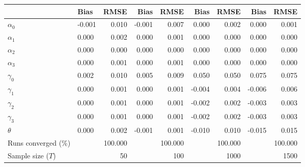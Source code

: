 
\begin{tabular}[t]{llrrrrrrr}
\toprule
  & Bias & RMSE & Bias & RMSE & Bias & RMSE & Bias & RMSE\\
\midrule
$\alpha_{0}$ & -0.001 & 0.010 & -0.001 & 0.007 & 0.000 & 0.002 & 0.000 & 0.001\\
$\alpha_{1}$ & 0.000 & 0.002 & 0.000 & 0.001 & 0.000 & 0.000 & 0.000 & 0.000\\
$\alpha_{2}$ & 0.000 & 0.000 & 0.000 & 0.000 & 0.000 & 0.000 & 0.000 & 0.000\\
$\alpha_{3}$ & 0.000 & 0.001 & 0.000 & 0.001 & 0.000 & 0.000 & 0.000 & 0.000\\
$\gamma_{0}$ & 0.002 & 0.010 & 0.005 & 0.009 & 0.050 & 0.050 & 0.075 & 0.075\\
$\gamma_{1}$ & 0.000 & 0.001 & 0.000 & 0.001 & -0.004 & 0.004 & -0.006 & 0.006\\
$\gamma_{2}$ & 0.000 & 0.001 & 0.000 & 0.001 & -0.002 & 0.002 & -0.003 & 0.003\\
$\gamma_{3}$ & 0.000 & 0.001 & 0.000 & 0.001 & -0.002 & 0.002 & -0.003 & 0.003\\
$\theta$ & 0.000 & 0.002 & -0.001 & 0.001 & -0.010 & 0.010 & -0.015 & 0.015\\
Runs converged (\%) &  & 100.000 &  & 100.000 &  & 100.000 &  & 100.000\\
Sample size ($T$) &  & 50 &  & 100 &  & 1000 &  & 1500\\
\bottomrule
\end{tabular}
